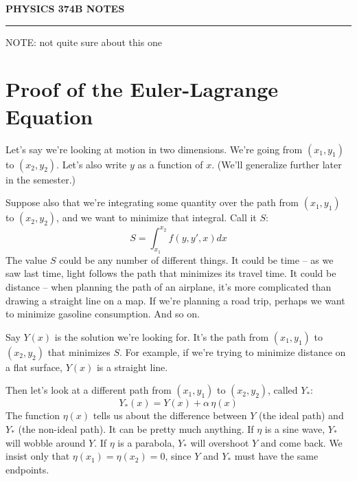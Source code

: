 \documentclass[10pt]{article}
\begin{document}
\setlength{\parindent}{0in}
\setlength{\parskip}{1em}

\begin{center}
{\bf PHYSICS 374B NOTES}
\end{center}
\hrule
\vskip0.15in

NOTE: not quite sure about this one

\section*{Proof of the Euler-Lagrange Equation}

Let's say we're looking at motion in two dimensions. We're going from $\left( x_1, y_1 \right)$ to $\left( x_2, y_2 \right)$. Let's also write $y$ as a function of $x$. (We'll generalize further later in the semester.)

Suppose also that we're integrating some quantity over the path from $\left( x_1, y_1 \right)$ to $\left( x_2, y_2 \right)$, and we want to minimize that integral. Call it $S$:
$$
S = \displaystyle\int_{x_1}^{x_2} f(y, y', x) dx
$$
The value $S$ could be any number of different things. It could be time -- as we saw last time, light follows the path that minimizes its travel time. It could be distance -- when planning the path of an airplane, it's more complicated than drawing a straight line on a map. If we're planning a road trip, perhaps we want to minimize gasoline consumption. And so on. 

Say $Y(x)$ is the solution we're looking for. It's the path from $\left( x_1, y_1 \right)$ to $\left( x_2, y_2 \right)$ that minimizes $S$. For example, if we're trying to minimize distance on a flat surface, $Y(x)$ is a straight line. 

Then let's look at a different path from $\left( x_1, y_1 \right)$ to $\left( x_2, y_2 \right)$, called $Y_*$:
$$
Y_*(x) = Y(x) + \alpha \, \eta(x)
$$
The function $\eta(x)$ tells us about the difference between $Y$ (the ideal path) and $Y_*$ (the non-ideal path). It can be pretty much anything. If $\eta$ is a sine wave, $Y_*$ will wobble around $Y$. If $\eta$ is a parabola, $Y_*$ will overshoot $Y$ and come back. We insist only that $\eta(x_1)=\eta(x_2)=0$, since $Y$ and $Y_*$ must have the same endpoints.
\end{document}
